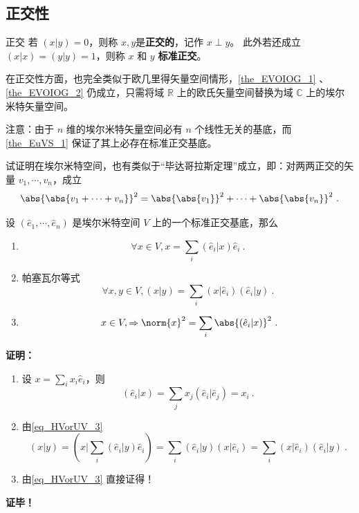 \subsection{正交性}
\begin{definition}{正交}
若 $(  x|  y)=0$，则称 $  x,  y$是\textbf{正交的}，记作 $  x\perp  y$。
此外若还成立 $(  x|  x)=(  y|  y)=1$，则称 $  x$ 和 $  y$ \textbf{标准正交}。
\end{definition}
在正交性方面，也完全类似于欧几里得矢量空间情形，\autoref{the_EVOIOG_1} 、\autoref{the_EVOIOG_2} 仍成立，只需将域 $\mathbb{R}$ 上的欧氏矢量空间替换为域 $\mathbb{C}$ 上的埃尔米特矢量空间。

注意：由于 $n$ 维的埃尔米特矢量空间必有 $n$ 个线性无关的基底，而\autoref{the_EuVS_1} 保证了其上必存在标准正交基底。
\begin{example}{}
试证明在埃尔米特空间，也有类似于“毕达哥拉斯定理”成立，即：对两两正交的矢量 $  v_1,\cdots,  v_n$，成立
\begin{equation}
\abs{\abs{  v_1+\cdots+  v_n}}^2=\abs{\abs{  v_1}}^2+\cdots+\abs{\abs{  v_n}}^2~.
\end{equation}
\end{example}

\begin{theorem}{}
设 $(\hat e_1,\cdots, \hat e_n)$ 是埃尔米特空间 $V$ 上的一个标准正交基底，那么
\begin{enumerate}
\item \begin{equation}\label{eq_HVorUV_3}
\forall  x\in V,  x=\sum_{i}( \hat e_i|  x)\hat e_i~.
\end{equation}
\item 帕塞瓦尔等式
\begin{equation}
\forall  x,  y\in V,(  x|  y)=\sum_{i}(  x|\hat e_i)(  \hat e_i|  y)~.
\end{equation}
\item \begin{equation}
\  x\in V,\Rightarrow\norm{  x}^2=\sum_{i}\abs{(  \hat e_i|  x)}^2~.
\end{equation}
\end{enumerate}
\end{theorem}
\textbf{证明：}\begin{enumerate}
\item 设 $  x=\sum_{i}x_i 
 \hat e_i$，则
\begin{equation}
( \hat e_i|  x)=\sum_{j}x_j( \hat e_i| \hat e_j)=x_i~.
\end{equation}
\item 由\autoref{eq_HVorUV_3} 
\begin{equation}
(  x|  y)=(  x|\sum_{i}( \hat e_i|  y) \hat e_i)=\sum_{i}( \hat e_i|  y)(  x| \hat e_i)=\sum_{i}(  x| \hat e_i)( \hat e_i|  y)~.
\end{equation}
\item 由\autoref{eq_HVorUV_3} 直接证得！
\end{enumerate}
\textbf{证毕！}
